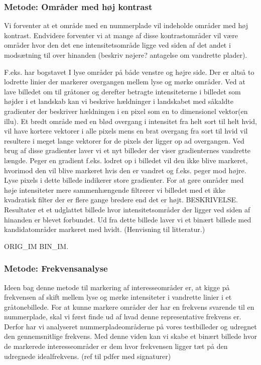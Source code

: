 \subsubsection{Metode: Områder med høj kontrast}
Vi forventer at et område med en nummerplade vil indeholde områder med høj kontrast. Endvidere forventer vi at mange af disse kontrastområder vil være områder hvor den det ene intensitetsområde ligge ved siden af det andet i modsætning til over hinanden (beskriv nøjere? antagelse om vandrette plader). 

F.eks. har bogstavet I lyse områder på både venstre og højre side. Der er altså to lodrette linier der markerer overgangen mellem lyse og mørke områder. Ved at lave billedet om til gråtoner og derefter betragte intensiteterne i billedet som højder i et landskab kan vi beskrive hældninger i landskabet med såkaldte gradienter der beskriver hældningen i en pixel som en to dimensionel vektor(en illu). Et bredt område med en blød overgang i intensitet fra helt sort til helt hvid, vil have kortere vektorer i alle pixels mens en brat overgang fra sort til hvid vil resultere i meget lange vektorer for de pixels der ligger op ad overgangen. Ved brug af disse gradienter laver vi et nyt billeder der viser gradienternes vandrette længde. Peger en gradient f.eks. lodret op i billedet vil den ikke blive markeret, hvorimod den vil blive markeret hvis den er vandret og f.eks. peger mod højre. Lyse pixels i dette billede indikerer store gradienter. For at gøre områder med høje intensiteter mere sammenhængende filtrerer vi billedet med et ikke kvadratisk filter der er flere gange bredere end det er højt. BESKRIVELSE. Resultater et et udglattet billede hvor intensitetsområder der ligger ved siden af hinanden er blevet forbundet. Ud fra dette billede laver vi et binært billede med kandidatområder markeret med hvidt. (Henvisning til litteratur.)

ORIG\_IM BIN\_IM.


\subsubsection{Metode: Frekvensanalyse}
\label{sec_frekvensanalyse} 
Ideen bag denne metode til markering af interesseområder er, at kigge på frekvensen af skift mellem lyse og mørke intensiteter i vandrette linier i et gråtonebillede. For at kunne markere områder der har en frekvens svarende til en nummerplade, skal vi først finde ud af hvad denne representative frekvens er. Derfor har vi analyseret nummerpladeområderne på vores testbilleder og udregnet den gennemsnitlige frekvens. Med denne viden kan vi skabe et binært billede hvor de markerede interesseområder er dem hvor frekvensen ligger tæt på den udregnede idealfrekvens. (ref til pdfer med signaturer)

